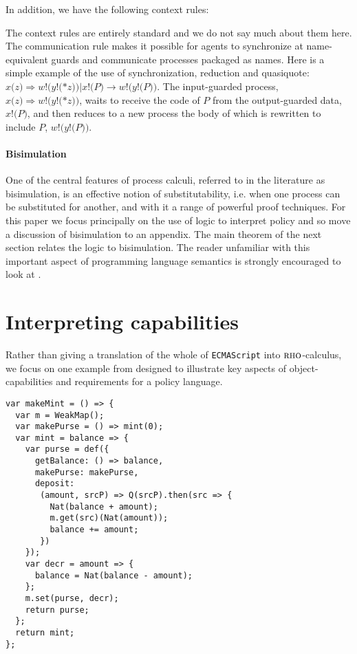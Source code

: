 \documentclass[]{acm_proc_article-sp}
\newcommand{\id}[1]{\texttt{#1}}
\newcommand{\juxtap}{\mathbin{\id{|}}}
\newcommand{\scong}{\mathbin{\equiv}}
\newcommand{\red}{\rightarrow}
\numberwithin{equation}{subsection}
\newcommand{\rhoc}{${\textsc{rho}}$-calculus}
\begin{document}
In addition, we have the following context rules:

\infrule[Par]{{P} \red {P}'}{{{P} \juxtap {Q}} \red {{P}' \juxtap {Q}}}

\infrule[Equiv]{{{P} \scong {P}'} \andalso {{P}' \red {Q}'} \andalso {{Q}' \scong {Q}}}{{P} \red {Q}}

The context rules are entirely standard and we do not say much about
them here. The communication rule makes it possible for agents to
synchronize at name-equivalent guards and communicate processes
packaged as names. Here is a simple example of the use of
synchronization, reduction and quasiquote: $x{(}{z}{)} \Rightarrow
{w}{!}{(}{y}{!}{(}{*}{z}{)}{)} \juxtap x{!}{(}{P}{)} \red
{w}{!}{(}{y}{!}{(}P{)}{)}$. The input-guarded process, $x{(}{z}{)}
\Rightarrow {w}{!}{(}{y}{!}{(}{*}{z}{)}{)}$, waits to receive the code
of $P$ from the output-guarded data, $x{!}{(}{P}{)}$, and then reduces
to a new process the body of which is rewritten to include $P$,
${w}{!}{(}{y}{!}{(}P{)}{)}$.

\paragraph{Bisimulation}

One of the central features of process calculi, referred to in the
literature as bisimulation, is an effective notion of
substitutability, i.e. when one process can be substituted for
another, and with it a range of powerful proof techniques. For this
paper we focus principally on the use of logic to interpret policy and
so move a discussion of bisimulation to an appendix. The main theorem
of the next section relates the logic to bisimulation. The reader
unfamiliar with this important aspect of programming language
semantics is strongly encouraged to look at
\cite{DBLP:LNCS/Sangiorgi06}.

\section{Interpreting capabilities}

Rather than giving a translation of the whole of {\tt ECMAScript} into
\rhoc, we focus on one example from
\cite{Drossopoulou:2013:NCP:2489804.2489811} designed to illustrate
key aspects of object-capabilities and requirements for a policy
language.

\begin{verbatim}
var makeMint = () => {
  var m = WeakMap();
  var makePurse = () => mint(0);
  var mint = balance => {
    var purse = def({
      getBalance: () => balance,
      makePurse: makePurse,
      deposit:
       (amount, srcP) => Q(srcP).then(src => {
         Nat(balance + amount);
         m.get(src)(Nat(amount));
         balance += amount;
       })
    });
    var decr = amount => {
      balance = Nat(balance - amount);
    };
    m.set(purse, decr);
    return purse;
  };
  return mint;
};
\end{verbatim}
\end{document}
